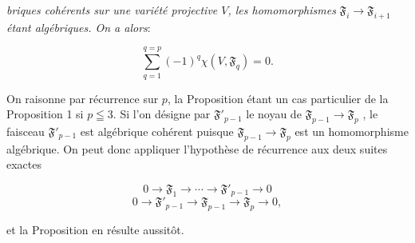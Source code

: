 %
%
%
%
\textit{briques cohérents sur une variété projective $V$, les homomorphismes} $\mathfrak{F}_i \rightarrow \mathfrak{F}_{i+1}$ \textit{étant algébriques. On a alors}:

\begin{equation*}
\sum_{q=1}^{q=p} (-1)^q \chi(V, \mathfrak{F}_q) = 0.
\end{equation*}

On raisonne par récurrence sur $p$, la Proposition étant un cas particulier de la Proposition 1 si $p \leqq 3$. Si l'on désigne par $\mathfrak{F}'_{p-1}$ le noyau de $\mathfrak{F}_{p-1} \rightarrow \mathfrak{F}_p$ , le faisceau $\mathfrak{F}'_{p-1}$ est algébrique cohérent puisque $\mathfrak{F}_{p-1} \rightarrow \mathfrak{F}_p$ est un homomorphisme algébrique. On peut donc appliquer l'hypothèse de récurrence aux deux suites exactes

\begin{equation*}
0 \rightarrow \mathfrak{F}_1 \rightarrow \cdots \rightarrow \mathfrak{F}'_{p-1} \rightarrow 0
\end{equation*}
\begin{equation*}
0 \rightarrow \mathfrak{F}'_{p-1} \rightarrow \mathfrak{F}_{p-1} \rightarrow \mathfrak{F}_p \rightarrow 0,
\end{equation*}

et la Proposition en résulte aussitôt.

